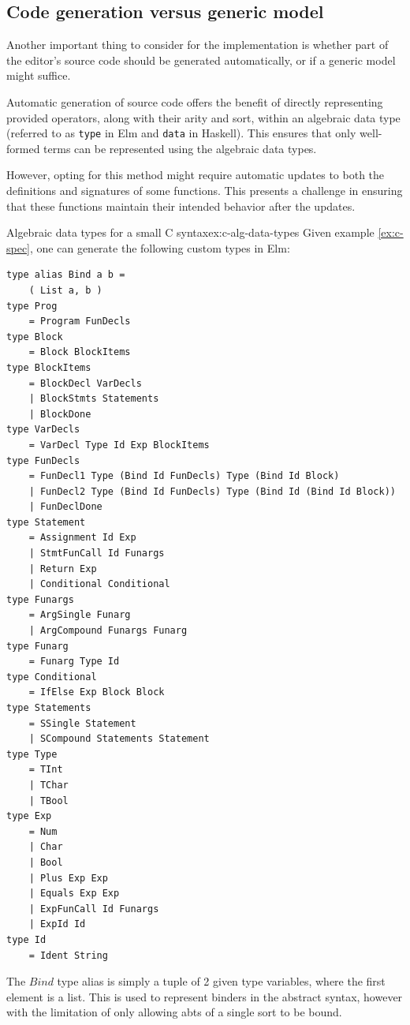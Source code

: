 \subsection{Code generation versus generic model}

Another important thing to consider for the implementation is whether
part of the editor's source code should be generated automatically,
or if a generic model might suffice.

Automatic generation of source code offers the benefit of directly representing
provided operators, along with their arity and sort, within an algebraic data
type (referred to as \texttt{type} in Elm and \texttt{data} in Haskell).
This ensures that only well-formed terms can be represented using the algebraic
data types.

However, opting for this method might require automatic updates to both the
definitions and signatures of some functions.
This presents a challenge in ensuring that these functions maintain their intended
behavior after the updates.

\begin{example}{Algebraic data types for a small C syntax}{ex:c-alg-data-types}
  Given example \cref{ex:c-spec}, one can generate the following custom types in Elm:
  \begin{lstlisting}[style=examplestyle]
type alias Bind a b =
    ( List a, b )
type Prog
    = Program FunDecls
type Block
    = Block BlockItems
type BlockItems
    = BlockDecl VarDecls
    | BlockStmts Statements
    | BlockDone
type VarDecls
    = VarDecl Type Id Exp BlockItems
type FunDecls
    = FunDecl1 Type (Bind Id FunDecls) Type (Bind Id Block)
    | FunDecl2 Type (Bind Id FunDecls) Type (Bind Id (Bind Id Block))
    | FunDeclDone
type Statement
    = Assignment Id Exp
    | StmtFunCall Id Funargs
    | Return Exp
    | Conditional Conditional
type Funargs
    = ArgSingle Funarg
    | ArgCompound Funargs Funarg
type Funarg
    = Funarg Type Id
type Conditional
    = IfElse Exp Block Block
type Statements
    = SSingle Statement
    | SCompound Statements Statement
type Type
    = TInt
    | TChar
    | TBool
type Exp
    = Num
    | Char
    | Bool
    | Plus Exp Exp
    | Equals Exp Exp
    | ExpFunCall Id Funargs
    | ExpId Id
type Id
    = Ident String
\end{lstlisting}

  The $Bind$ type alias is simply a tuple of 2 given type variables,
  where the first element is a list. This is used to represent binders in the
  abstract syntax, however with the limitation of only allowing abts of a single
  sort to be bound.
\end{example}

